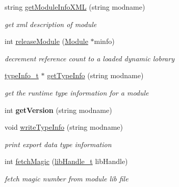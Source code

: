 \begin{DoxyCompactItemize}
\mbox{\label{classModuleLoader_a6768a60b55dc11cb5cc5aea2d7bb2a8d}} 
string \hyperlink{classModuleLoader_a6768a60b55dc11cb5cc5aea2d7bb2a8d}{get\+Module\+Info\+X\+ML} (string modname)
\begin{DoxyCompactList}\small\item\em get xml description of module \end{DoxyCompactList}\item 
int \hyperlink{classModuleLoader_aa9dd4cbeb24b4a413a270c192bce95b4}{release\+Module} (\hyperlink{classModule}{Module} $\ast$minfo)
\begin{DoxyCompactList}\small\item\em decrement reference count to a loaded dynamic lobrary \end{DoxyCompactList}\item 
\hyperlink{structtypeInfo__t}{type\+Info\+\_\+t} $\ast$ \hyperlink{classModuleLoader_ac9828e3ed8c3ffa0b6bfb54dc43d5be3}{get\+Type\+Info} (string modname)
\begin{DoxyCompactList}\small\item\em get the runtime type information for a module \end{DoxyCompactList}\item 
\mbox{\label{classModuleLoader_aeec24847fe646ce612720c657185e420}} 
int {\bfseries get\+Version} (string modname)
\item 
void \hyperlink{classModuleLoader_ac3ddb6d3909749301dea325f1e820f2d}{write\+Type\+Info} (string modname)
\begin{DoxyCompactList}\small\item\em print export data type information \end{DoxyCompactList}\item 
\mbox{\label{classModuleLoader_a6b23900d6a7316a3df2583854f41b1ed}} 
int \hyperlink{classModuleLoader_a6b23900d6a7316a3df2583854f41b1ed}{fetch\+Magic} (\hyperlink{Module_8h_acbeb44869400b78e5f4097d5c49fc093}{lib\+Handle\+\_\+t} lib\+Handle)
\begin{DoxyCompactList}\small\item\em fetch magic number from module lib file \end{DoxyCompactList}\item 
\mbox{\label{classModuleLoader_af3bc48297a382f05a39d0f63adc7afe4}} 

\end{DoxyCompactItemize}
